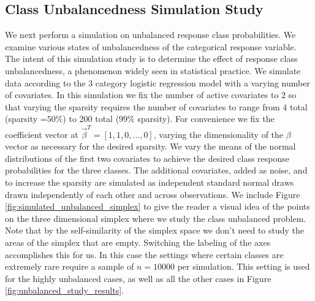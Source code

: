 \subsection{Class Unbalancedness Simulation Study}
We next perform a simulation on unbalanced response class probabilities. We examine various states of unbalancedness of the categorical response variable. The intent of this simulation study is to determine the effect of response class unbalancedness, a phenomenon widely seen in statistical practice. We simulate data according to the $3$ category logistic regression model with a varying number of covariates. In this simulation we fix the number of active covariates to $2$ so that varying the sparsity requires the number of covariates to range from $4$ total (sparsity =$50\%$) to $200$ total ($99\%$ sparsity). For convenience we fix the coefficient vector at $\vec{\beta}^T =[1,1,0,\dots, 0]$, varying the dimensionality of the $\beta$ vector as necessary for the desired sparsity. We vary the means of the normal distributions of the first two covariates to achieve the desired class response probabilities for the three classes. The additional covariates, added as noise, and to increase the sparsity are simulated as independent standard normal draws drawn independently of each other and across observations. We include Figure \ref{fig:simulated_unbalanced_simplex} to give the reader a visual idea of the points on the three dimensional simplex where we study the class unbalanced problem. Note that by the self-similarity of the simplex space we don't need to study the areas of the simplex that are empty. Switching the labeling of the axes accomplishes this for us. In this case the settings where certain classes are extremely rare require a sample of $n=10000$ per simulation. This setting is used for the highly unbalanced cases, as well as all the other cases in Figure \ref{fig:unbalanced_study_results}.

